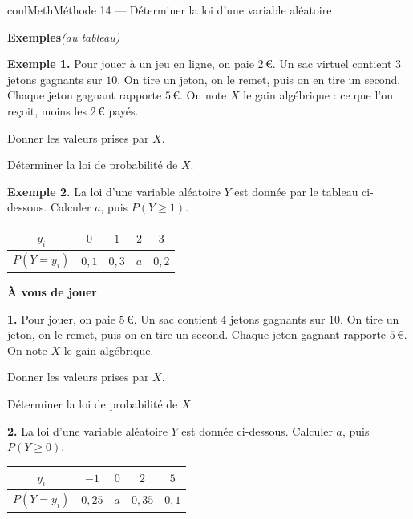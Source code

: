 \documentclass[11pt,a4paper]{article}
\makeatletter
\renewcommand{\ge}{\geqslant}
\newcounter{lycee@signet}
\newcommand{\signet}[3][]{\stepcounter{lycee@signet}%
  \edef\lycee@dest{\if\relax\detokenize{#1}\relax
    signet.\arabic{lycee@signet}\else#1\fi}%
  \hypertarget{\lycee@dest}{}\bookmark[level=#2,dest=\lycee@dest]{#3}}
\newcounter{methode}
\newenvironment{methodebox}[1][Méthode]{\stepcounter{methode}%
  \begin{boitecours}[phantom={\signet[methode-\arabic{methode}]{2}{#1}}]{coulMeth}{#1}}%
  {\end{boitecours}}
\newcommand{\etape}[1]{\par\smallskip\textbf{\color{coulMeth}#1}\par\nobreak\smallskip}
\newcommand{\autableau}{\hfill{\footnotesize\itshape\color{black!45}(au tableau)}}
\newcommand{\etapeexemples}{%
    \par\smallskip\textbf{\color{coulMeth}Exemples}\autableau\par\nobreak\smallskip}
\makeatother
\begin{document}
\begin{methodebox}[Méthode 14 --- Déterminer la loi d'une variable aléatoire]
\etapeexemples
\textbf{Exemple 1.} Pour jouer à un jeu en ligne, on paie $2$\,€. Un sac virtuel
contient $3$ jetons gagnants sur $10$. On tire un jeton, on le remet, puis on en tire
un second. Chaque jeton gagnant rapporte $5$\,€. On note $X$ le gain algébrique : ce
que l'on reçoit, moins les $2$\,€ payés.
\begin{questions}[label=\alph*)]
  \item Donner les valeurs prises par $X$.
  \item Déterminer la loi de probabilité de $X$.
\end{questions}

\medskip
\textbf{Exemple 2.} La loi d'une variable aléatoire $Y$ est donnée par le tableau
ci-dessous. Calculer $a$, puis $P(Y\ge 1)$.
\begin{center}
\renewcommand{\arraystretch}{1.4}
\begin{tabular}{|c|c|c|c|c|}
\hline
$y_{i}$ & $0$ & $1$ & $2$ & $3$\\\hline
$P(Y=y_{i})$ & $0{,}1$ & $0{,}3$ & $a$ & $0{,}2$\\\hline
\end{tabular}
\end{center}

\etape{À vous de jouer}
\textbf{1.} Pour jouer, on paie $5$\,€. Un sac contient $4$ jetons gagnants sur $10$.
On tire un jeton, on le remet, puis on en tire un second. Chaque jeton gagnant rapporte
$5$\,€. On note $X$ le gain algébrique.
\begin{questions}[label=\alph*)]
  \item Donner les valeurs prises par $X$.
  \item Déterminer la loi de probabilité de $X$.
\end{questions}
\textbf{2.} La loi d'une variable aléatoire $Y$ est donnée ci-dessous. Calculer $a$, puis
$P(Y\ge 0)$.
\begin{center}
\renewcommand{\arraystretch}{1.4}
\begin{tabular}{|c|c|c|c|c|}
\hline
$y_{i}$ & $-1$ & $0$ & $2$ & $5$\\\hline
$P(Y=y_{i})$ & $0{,}25$ & $a$ & $0{,}35$ & $0{,}1$\\\hline
\end{tabular}
\end{center}

\end{methodebox}
\end{document}
